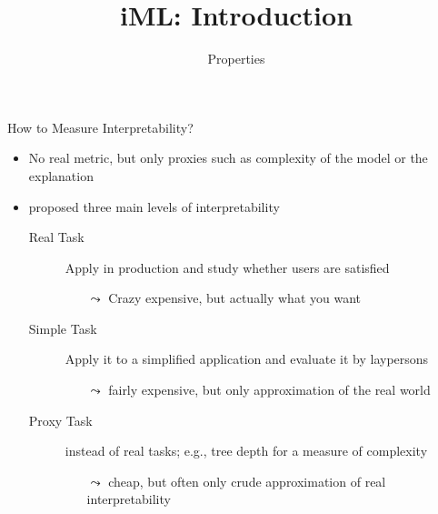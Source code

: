 \documentclass[aspectratio=169]{../latex_main/tntbeamer}  %
\title[Introduction]{iML: Introduction}
\subtitle{Properties}
\begin{document}
	
	\maketitle


\begin{frame}[c]{How to Measure Interpretability?}
	
	\begin{itemize}
	    \item No real metric, but only proxies such as complexity of the model or the explanation
	    \pause
	    \item {} proposed three main levels of interpretability
	    \begin{description}
	        \item[Real Task] Apply in production and study whether users are satisfied
	        \begin{itemize}
	            \item[$\leadsto$] Crazy expensive, but actually what you want
	        \end{itemize}
	        \pause
	        \item[Simple Task] Apply it to a simplified application and evaluate it by laypersons
	        \begin{itemize}
	            \item[$\leadsto$] fairly expensive, but only approximation of the real world
	        \end{itemize}
	        \pause
	        \item[Proxy Task] instead of real tasks; e.g., tree depth for a measure of complexity
	        \begin{itemize}
	            \item[$\leadsto$] cheap, but often only crude approximation of real interpretability
	        \end{itemize}
	        
	    \end{description}
	\end{itemize}
	
\end{frame}
\end{document}
